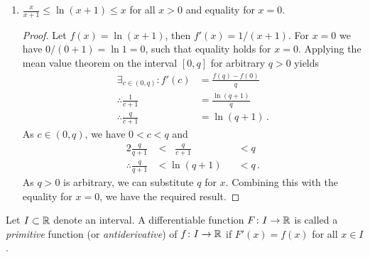 \documentclass[week=6]{homework}
\begin{document}
\begin{questions}
\begin{enumerate}[label=(\alph*)]
	    	\addtocounter{enumi}{1}
	    	\item
	    	\begin{inlinetoprove}
	    		$ \displaystyle \frac{x}{x+1} \le \ln(x+1) \le x$ for all $x>0$ and equality for $x=0$.
	    	\end{inlinetoprove}
	    	\begin{proof}
	    		Let $f(x) = \ln(x+1)$, then $f'(x) = 1/(x+1)$. For $x=0$ we have $0/(0+1) = \ln 1 = 0$, such that equality holds for $x = 0$.
	    		Applying the mean value theorem on the interval $[0,q]$ for arbitrary $q > 0$ yields
	    		\begin{align*}
	    			\exists_{c \in (0,q)}: f'(c) &= \frac{f(q)-f(0)}{q} \\
	    			\therefore \frac{1}{c+1} &= \frac{\ln(q+1)}{q} \\
	    			\therefore \frac{q}{c+1} &= \ln(q+1)\,.
	    		\end{align*}
	    		As $c \in (0,q)$, we have $0 < c < q$ and
	    		\begin{alignat*}{2}
		    		\frac{q}{q+1} &< \hspace{7pt} \frac{q}{c+1} &&< q \\
		    		\therefore	\frac{q}{q+1} &< \ln(q+1) &&< q\,. 
	    		\end{alignat*}
	    		As $q > 0$ is arbitrary, we can substitute $q$ for $x$. Combining this with the equality for $x=0$, we have the required result.
	    	\end{proof}
	    \end{enumerate}
    
	    \question
	    Let $I \subset \mathbb{R}$ denote an interval. A differentiable function $F \colon I \to \mathbb{R}$ is called a \textit{primitive} function (or \textit{antiderivative}) of $f \colon I \to \mathbb{R}$ if $F'(x) = f(x)$ for all $x \in I$.
	    

\end{questions}
\end{document}
